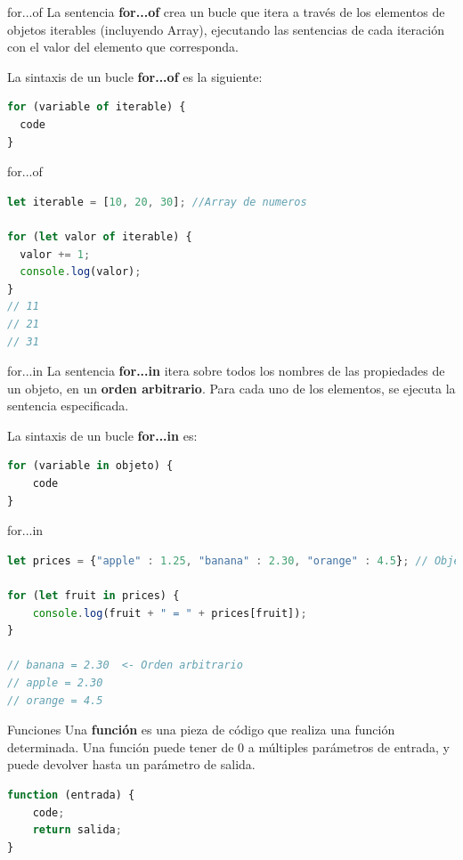 \documentclass{beamer}
\begin{document}
\begin{frame}[fragile]{for...of}
La sentencia \textbf{for...of} crea un bucle que itera a través de los elementos de objetos iterables (incluyendo Array), ejecutando las sentencias de cada iteración con el valor del elemento que corresponda.\newline

La sintaxis de un bucle \textbf{for...of} es la siguiente:
\begin{lstlisting}[language=JavaScript]
for (variable of iterable) {
  code
}
\end{lstlisting}
\end{frame}

\begin{frame}[fragile]{for...of}
\begin{lstlisting}[language=JavaScript]
let iterable = [10, 20, 30]; //Array de numeros

for (let valor of iterable) {
  valor += 1;
  console.log(valor);
}
// 11
// 21
// 31
\end{lstlisting}
\end{frame}

\begin{frame}[fragile]{for...in}
La sentencia \textbf{for...in} itera sobre todos los nombres de las propiedades de un objeto, en un \textbf{orden arbitrario}. Para cada uno de los elementos, se ejecuta la sentencia especificada.

La sintaxis de un bucle \textbf{for...in} es:
\begin{lstlisting}[language=JavaScript]
for (variable in objeto) {
    code
}
\end{lstlisting}
\end{frame}

\begin{frame}[fragile]{for...in}
\begin{lstlisting}[language=JavaScript]
let prices = {"apple" : 1.25, "banana" : 2.30, "orange" : 4.5}; // Objeto

for (let fruit in prices) {
    console.log(fruit + " = " + prices[fruit]);
}

// banana = 2.30  <- Orden arbitrario
// apple = 2.30  
// orange = 4.5 


\end{lstlisting}
\end{frame}

\begin{frame}[fragile]{Funciones}
Una \textbf{función} es una pieza de código que realiza una función determinada. Una función puede tener de 0 a múltiples parámetros de entrada, y puede devolver hasta un parámetro de salida.
\begin{lstlisting}[language=JavaScript]
function (entrada) {
    code;
    return salida;
}
\end{lstlisting}
\end{frame}
\end{document}
